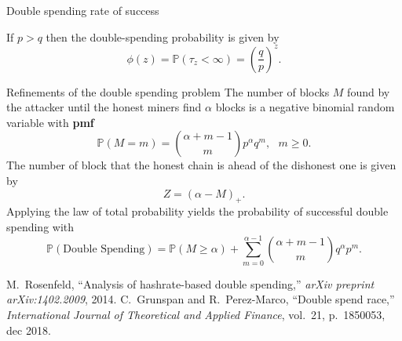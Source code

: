 \documentclass{beamer}
\makeatletter
\newcommand*{\pmf}{\textbf{pmf}\@\xspace}
\makeatother
\begin{document}
\begin{frame}{Double spending rate of success}
\begin{tikzpicture}
\end{tikzpicture}
\begin{tcolorbox}[enhanced,drop shadow, title=Double spending theorem]
If $p>q$ then the double-spending probability is given by
$$
\phi(z) = \mathbb{P}(\tau_z<\infty)=\left(\frac{q}{p}\right)^{z}.
$$
\end{tcolorbox}

\end{frame}
\begin{frame}{Refinements of the double spending problem}
\scriptsize
The number of blocks $M$ found by the attacker until the honest miners find $\alpha$ blocks is a negative binomial random variable with \pmf
$$
\mathbb{P}(M = m) = \binom{\alpha+m-1}{m}p^\alpha q^m,\text{ }m\geq0.
$$
The number of block that the honest chain is ahead of the dishonest one is given by 
$$
Z= (\alpha-M)_+.
$$
Applying the law of total probability yields the probability of successful double spending with
$$
\mathbb{P}(\text{Double Spending}) = \mathbb{P}(M\geq \alpha) + \sum_{m = 0}^{\alpha - 1}\binom{\alpha+m-1}{m}q^{\alpha} p^{m}.
$$ 
\tiny


\begin{thebibliography}{1}
M.~Rosenfeld, ``Analysis of hashrate-based double spending,'' {\em arXiv
  preprint arXiv:1402.2009}, 2014.
C.~Grunspan and R.~Perez-Marco, ``Double spend race,'' {\em
  International Journal of Theoretical and Applied Finance}, vol.~21,
  p.~1850053, dec 2018.
\end{thebibliography}

\end{frame}
\end{document}
